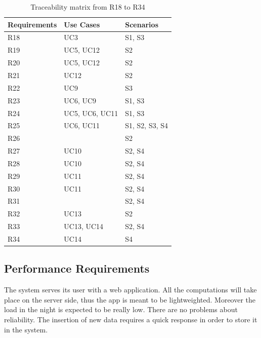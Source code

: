 \begin{table}[ht]
    \begin{center}
        \begin{tabular}{|p{2cm}|p{5cm}|p{3cm}|}
            \toprule Requirements & Use Cases & Scenarios \\
            \midrule
            R18 & UC3 & S1, S3 \\
            \midrule
            R19 & UC5, UC12 & S2 \\
            \midrule
            R20 & UC5, UC12 & S2 \\
            \midrule
            R21 & UC12 & S2 \\
            \midrule
            R22 & UC9 & S3 \\
            \midrule
            R23 & UC6, UC9 & S1, S3 \\
            \midrule
            R24 & UC5, UC6, UC11 & S1, S3 \\
            \midrule
            R25 & UC6, UC11 & S1, S2, S3, S4 \\
            \midrule
            R26 & & S2 \\
            \midrule
            R27 & UC10 & S2, S4 \\
            \midrule
            R28 & UC10 & S2, S4 \\
            \midrule
            R29 & UC11 & S2, S4 \\
            \midrule
            R30 & UC11 & S2, S4 \\
            \midrule
            R31 & & S2, S4 \\
            \midrule
            R32 & UC13 & S2 \\
            \midrule
            R33 & UC13, UC14 & S2, S4 \\
            \midrule
            R34 & UC14 & S4 \\
            \bottomrule
            
        \end{tabular}
    \end{center}
    \caption{Traceability matrix from R18 to R34}
    
\end{table}
\subsection{Performance Requirements}
The system serves its user with a web application. All the computations will take place on the server side, 
thus the app is meant to be lightweighted. Moreover the load in the night is expected to be really low.
There are no problems about reliability. The insertion of new data requires a quick response in order to store 
it in the system.


